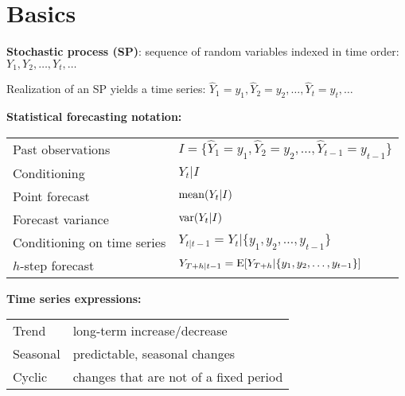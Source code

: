 
\section{Basics}

\textbf{Stochastic process (SP)}: sequence of random variables indexed in time order: $ Y_1, Y_2, \ldots, Y_t, \ldots $

Realization of an SP yields a time series: $ \hat{Y}_1=y_1, \hat{Y}_2=y_2, \ldots, \hat{Y}_t=y_t, \ldots $

\begin{minipage}[t]{0.55\textwidth}
\textbf{Statistical forecasting notation:}\\
\begin{tabular}{ll}
    Past observations & $I = \{\hat{Y}_1=y_1, \hat{Y}_2=y_2, \ldots, \hat{Y}_{t-1}=y_{t-1}\}$ \\
    Conditioning & $Y_t | I$ \\
    Point forecast & \(\operatorname{mean}(Y_t | I)\) \\
    Forecast variance & \(\operatorname{var}(Y_t | I)\) \\
    Conditioning on time series & $Y_{t|t-1} = Y_t | \{y_1, y_2, \ldots, y_{t-1}\}$ \\
    \(h\)-step forecast & \(Y_{T+h|t-1} = \operatorname{E}[Y_{T+h} | \{y_1, y_2, \ldots, y_{t-1}\}]\) \\
\end{tabular}
\end{minipage}
\hfill
\begin{minipage}[t]{0.40\textwidth}
\textbf{Time series expressions:}\\
\begin{tabular}{ll}
    Trend & long-term increase/decrease \\
    Seasonal & predictable, seasonal changes \\
    Cyclic & changes that are not of a fixed period \\
\end{tabular}
\end{minipage}

